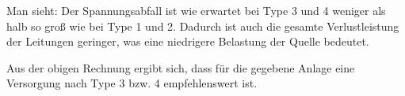 Man sieht: Der Spannungsabfall ist wie erwartet bei Type 3 und 4 weniger als halb so groß wie bei Type 1 und 2.
Dadurch ist auch die gesamte Verlustleistung der Leitungen geringer, was eine niedrigere Belastung der Quelle bedeutet.

Aus der obigen Rechnung ergibt sich, dass für die gegebene Anlage eine Versorgung nach Type 3 bzw. 4 empfehlenswert ist.